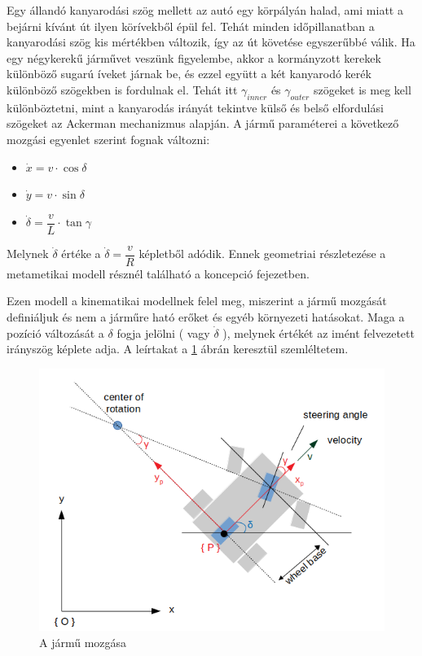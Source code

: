 Egy állandó kanyarodási szög mellett az autó egy körpályán halad, ami miatt a bejárni kívánt út ilyen körívekből épül fel. Tehát minden időpillanatban a kanyarodási szög kis mértékben változik, így az út követése egyszerűbbé válik. Ha egy négykerekű járművet veszünk figyelembe, akkor a kormányzott kerekek különböző sugarú íveket járnak be, és ezzel együtt a két kanyarodó kerék különböző szögekben is fordulnak el. Tehát itt $ \gamma_{inner} $  és $ \gamma_{outer} $ szögeket is meg kell különböztetni, mint a kanyarodás irányát tekintve külső és belső elfordulási szögeket az Ackerman mechanizmus alapján. 
A jármű paraméterei a következő mozgási egyenlet szerint fognak változni:
\begin{itemize}
	\item[] $ \dot{x} = v \cdot \cos\delta $
	\item[] $ \dot{y} = v \cdot \sin\delta $
	\item[] $ \dot{\delta} = \dfrac{v}{L} \cdot \tan\gamma $
\end{itemize}

Melynek $ \dot{\delta} $ értéke a $ \dot{\delta} = \dfrac{v}{R} $ képletből adódik. Ennek geometriai részletezése a metametikai modell résznél található a koncepció fejezetben. 

Ezen modell a kinematikai modellnek felel meg, miszerint a jármű mozgását definiáljuk és nem a járműre ható erőket és egyéb környezeti hatásokat. Maga a pozíció változását a $ \delta $ fogja jelölni ( vagy $ \dot{\delta} $ ), melynek értékét az imént felvezetett irányszög képlete adja. A leírtakat a \ref{fig:position} ábrán keresztül szemléltetem.\\

\begin{figure}[h!]
\centering
\includegraphics[scale=0.70]{images/position.png}
\caption{A jármű mozgása}
\label{fig:position}
\end{figure}

